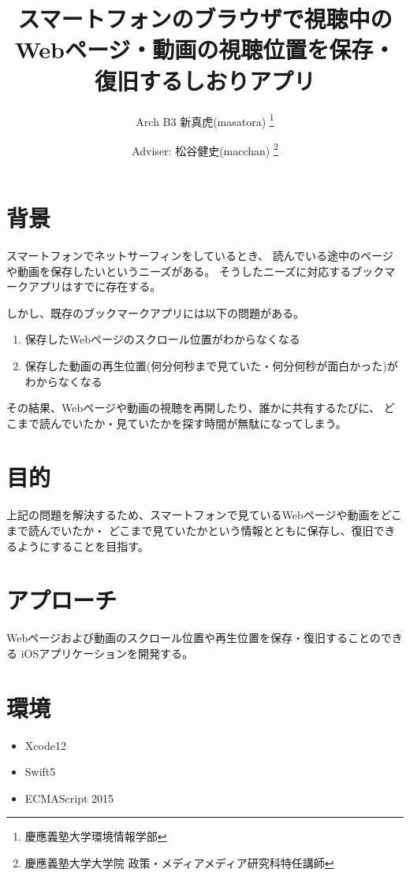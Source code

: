 \documentclass[a4j,10pt]{jsarticle}
\begin{document}

\title{スマートフォンのブラウザで視聴中のWebページ・動画の視聴位置を保存・復旧するしおりアプリ}

\author{
    Arch B3 新真虎(masatora) \thanks{慶應義塾大学環境情報学部}
    \and
    Adviser: 松谷健史(macchan) \thanks{慶應義塾大学大学院 政策・メディアメディア研究科特任講師}
}

\maketitle
\thispagestyle{empty}

\section{背景}
スマートフォンでネットサーフィンをしているとき、
読んでいる途中のページや動画を保存したいというニーズがある\cite{net-surfin}。
そうしたニーズに対応するブックマークアプリはすでに存在する\cite{Pocket}\cite{instapaper}。

しかし、既存のブックマークアプリには以下の問題がある。
\begin{enumerate}
\item 保存したWebページのスクロール位置がわからなくなる
\item 保存した動画の再生位置(何分何秒まで見ていた・何分何秒が面白かった)がわからなくなる
\end{enumerate}

その結果、Webページや動画の視聴を再開したり、誰かに共有するたびに、
どこまで読んでいたか・見ていたかを探す時間が無駄になってしまう。


\section{目的}
上記の問題を解決するため、スマートフォンで見ているWebページや動画をどこまで読んでいたか・
どこまで見ていたかという情報とともに保存し、復旧できるようにすることを目指す。

\section{アプローチ}
Webページおよび動画のスクロール位置や再生位置を保存・復旧することのできる
iOSアプリケーションを開発する\cite{shiori-web-for-safari}。

\section{環境}
\begin{itemize}
\item Xcode12
\item Swift5
\item ECMAScript 2015
\end{itemize}
\end{document}
